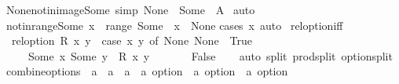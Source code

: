 \begin{isabellebody}
\isanewline
%
\endisadelimproof
\isanewline
{}\isamarkupfalse%
\ None{\isacharunderscore}{\kern0pt}notin{\isacharunderscore}{\kern0pt}image{\isacharunderscore}{\kern0pt}Some\ {\isacharbrackleft}{\kern0pt}simp{\isacharbrackright}{\kern0pt}{\isacharcolon}{\kern0pt}\ {\isachardoublequoteopen}None\ {\isasymnotin}\ Some\ {\isacharbackquote}{\kern0pt}\ A{\isachardoublequoteclose}\isanewline
%
\isadelimproof
%
\endisadelimproof
%
\isatagproof
{}\isamarkupfalse%
\ auto%
\endisatagproof
{\isafoldproof}%
%
\isadelimproof
\isanewline
%
\endisadelimproof
\isanewline
{}\isamarkupfalse%
\ notin{\isacharunderscore}{\kern0pt}range{\isacharunderscore}{\kern0pt}Some{\isacharcolon}{\kern0pt}\ {\isachardoublequoteopen}x\ {\isasymnotin}\ range\ Some\ {\isasymlongleftrightarrow}\ x\ {\isacharequal}{\kern0pt}\ None{\isachardoublequoteclose}\isanewline
%
\isadelimproof
%
\endisadelimproof
%
\isatagproof
{}\isamarkupfalse%
{\isacharparenleft}{\kern0pt}cases\ x{\isacharparenright}{\kern0pt}\ auto%
\endisatagproof
{\isafoldproof}%
%
\isadelimproof
\isanewline
%
\endisadelimproof
\isanewline
{}\isamarkupfalse%
\ rel{\isacharunderscore}{\kern0pt}option{\isacharunderscore}{\kern0pt}iff{\isacharcolon}{\kern0pt}\isanewline
\ \ {\isachardoublequoteopen}rel{\isacharunderscore}{\kern0pt}option\ R\ x\ y\ {\isacharequal}{\kern0pt}\ {\isacharparenleft}{\kern0pt}case\ {\isacharparenleft}{\kern0pt}x{\isacharcomma}{\kern0pt}\ y{\isacharparenright}{\kern0pt}\ of\ {\isacharparenleft}{\kern0pt}None{\isacharcomma}{\kern0pt}\ None{\isacharparenright}{\kern0pt}\ {\isasymRightarrow}\ True\isanewline
\ \ \ \ {\isacharbar}{\kern0pt}\ {\isacharparenleft}{\kern0pt}Some\ x{\isacharcomma}{\kern0pt}\ Some\ y{\isacharparenright}{\kern0pt}\ {\isasymRightarrow}\ R\ x\ y\isanewline
\ \ \ \ {\isacharbar}{\kern0pt}\ {\isacharunderscore}{\kern0pt}\ {\isasymRightarrow}\ False{\isacharparenright}{\kern0pt}{\isachardoublequoteclose}\isanewline
%
\isadelimproof
\ \ %
\endisadelimproof
%
\isatagproof
{}\isamarkupfalse%
\ {\isacharparenleft}{\kern0pt}auto\ split{\isacharcolon}{\kern0pt}\ prod{\isachardot}{\kern0pt}split\ option{\isachardot}{\kern0pt}split{\isacharparenright}{\kern0pt}%
\endisatagproof
{\isafoldproof}%
%
\isadelimproof
\isanewline
%
\endisadelimproof
\isanewline
\isanewline
{}\isamarkupfalse%
\ combine{\isacharunderscore}{\kern0pt}options\ {\isacharcolon}{\kern0pt}{\isacharcolon}{\kern0pt}\ {\isachardoublequoteopen}{\isacharparenleft}{\kern0pt}{\isacharprime}{\kern0pt}a\ {\isasymRightarrow}\ {\isacharprime}{\kern0pt}a\ {\isasymRightarrow}\ {\isacharprime}{\kern0pt}a{\isacharparenright}{\kern0pt}\ {\isasymRightarrow}\ {\isacharprime}{\kern0pt}a\ option\ {\isasymRightarrow}\ {\isacharprime}{\kern0pt}a\ option\ {\isasymRightarrow}\ {\isacharprime}{\kern0pt}a\ option{\isachardoublequoteclose}\isanewline

\end{isabellebody}
